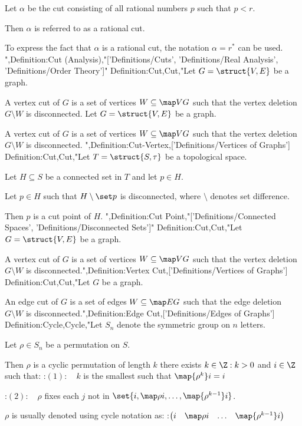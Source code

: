 Let $\alpha$ be the cut consisting of all rational numbers $p$ such that $p < r$.


Then $\alpha$ is referred to as a rational cut.


To express the fact that $\alpha$ is a rational cut, the notation $\alpha = r^*$ can be used.
",Definition:Cut (Analysis),"['Definitions/Cuts', 'Definitions/Real Analysis', 'Definitions/Order Theory']"
Definition:Cut,Cut,"Let $G = \struct {V, E}$ be a graph.


A vertex cut of $G$ is a set of vertices $W \subseteq \map V G$ such that the vertex deletion $G \setminus W$ is disconnected.
Let $G = \struct {V, E}$ be a graph.


A vertex cut of $G$ is a set of vertices $W \subseteq \map V G$ such that the vertex deletion $G \setminus W$ is disconnected.
",Definition:Cut-Vertex,['Definitions/Vertices of Graphs']
Definition:Cut,Cut,"Let $T = \struct {S, \tau}$ be a topological space.

Let $H \subseteq S$ be a connected set in $T$ and let $p \in H$.

Let $p \in H$ such that $H \setminus \set p$ is disconnected, where $\setminus$ denotes set difference.


Then $p$ is a cut point of $H$.
",Definition:Cut Point,"['Definitions/Connected Spaces', 'Definitions/Disconnected Sets']"
Definition:Cut,Cut,"Let $G = \struct {V, E}$ be a graph.


A vertex cut of $G$ is a set of vertices $W \subseteq \map V G$ such that the vertex deletion $G \setminus W$ is disconnected.",Definition:Vertex Cut,['Definitions/Vertices of Graphs']
Definition:Cut,Cut,"Let $G$ be a graph.


An edge cut of $G$ is a set of edges $W \subseteq \map E G$ such that the edge deletion $G \setminus W$ is disconnected.",Definition:Edge Cut,['Definitions/Edges of Graphs']
Definition:Cycle,Cycle,"Let $S_n$ denote the symmetric group on $n$ letters.

Let $\rho \in S_n$ be a permutation on $S$.


Then $\rho$ is a cyclic permutation of length $k$  there exists $k \in \Z: k > 0$ and $i \in \Z$ such that:
:$(1): \quad k$ is the smallest such that $\map {\rho^k} i = i$

:$(2): \quad \rho$ fixes each $j$ not in $\set {i, \map \rho i, \ldots, \map {\rho^{k - 1} } i}$.


$\rho$ is usually denoted using cycle notation as:
:$\begin{pmatrix} i & \map \rho i & \ldots & \map {\rho^{k - 1} } i \end{pmatrix}$

